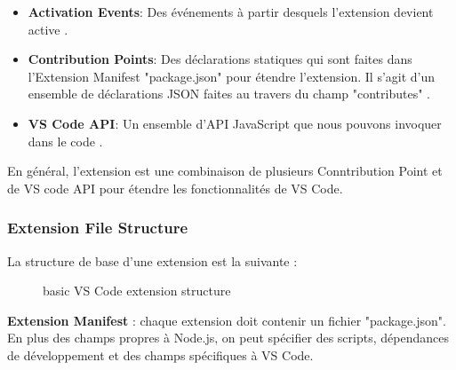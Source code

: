 \documentclass[
    iict, %
    il, %
]{heig-tb}
\begin{document}
\begin{itemize}
    \item \textbf{Activation Events}: Des événements à partir desquels l'extension devient active \cite{activation-events}.
    \item \textbf{Contribution Points}: Des déclarations statiques qui sont faites dans l'Extension Manifest "package.json" pour étendre l'extension. Il s'agit d'un ensemble de déclarations JSON faites au travers du champ "contributes" \cite{contribution-points}.
    \item \textbf{VS Code API}: Un ensemble d'API JavaScript que nous pouvons invoquer dans le code \cite{vs-code-api}.
\end{itemize}

En général, l'extension est une combinaison de plusieurs Conntribution Point et de VS code API pour étendre les fonctionnalités de VS Code.

\subsubsection{Extension File Structure}\label{Extension File Structure}

La structure de base d'une extension est la suivante :

\begin{figure}[!h]
    \centering
    \caption{basic VS Code extension structure}
\end{figure}


\textbf{Extension Manifest} :
chaque extension doit contenir un fichier "package.json". En plus des champs propres à Node.js, on peut spécifier des scripts, dépendances de développement et des champs spécifiques à VS Code.
\end{document}
